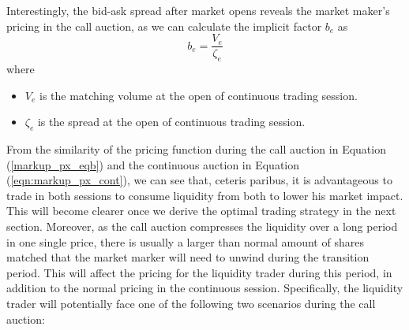 \documentclass{article}
\begin{document}
Interestingly, the bid-ask spread after market opens reveals the market maker's pricing in the call
auction, as we can calculate the implicit factor $b_e$ as
\begin{equation}\label{eqn:expected_spread}
  b_e = \frac{V_e}{\zeta_e}
\end{equation}
where
\begin{itemize}
  \item $V_e$ is the matching volume at the open of continuous trading session.
  \item $\zeta_e$ is the spread at the open of continuous trading session.
\end{itemize}

From the similarity of the pricing function during the call auction in Equation (\ref{markup_px_eqb}) and the continuous auction in Equation (\ref{eqn:markup_px_cont}), we can see that, ceteris paribus, it is advantageous to trade in both sessions to consume liquidity from both to lower his market impact. This will become clearer once we derive the optimal trading strategy in the next section. Moreover, as the call auction compresses the liquidity over a long period in one single price, there is usually a larger than normal amount of shares matched that the market marker will need to unwind during the transition period. This will affect the pricing for the liquidity trader during this period, in addition to the normal pricing in the continuous session. Specifically, the liquidity trader will potentially face one of the following two scenarios during the call auction:
\end{document}

